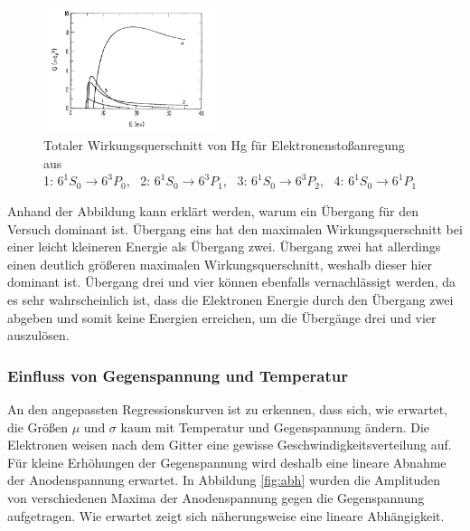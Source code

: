 \begin{figure}[!h]
  \centering
  \includegraphics[width=0.45\textwidth]{data/fh/wirkungsquerschnitt.png}
  \caption{Totaler Wirkungsquerschnitt von Hg für Elektronenstoßanregung aus \cite{wirkungsquerschnitt}\\ 1: $6^1S_0\rightarrow 6^3P_0$, \   2: $6^1S_0\rightarrow 6^3P_1$, \   3: $6^1S_0\rightarrow 6^3P_2$, \   4: $6^1S_0\rightarrow 6^1P_1$}
  \label{fig:wirkungsquerschnitt}
\end{figure}
Anhand der Abbildung kann erklärt werden, warum ein Übergang für den Versuch dominant ist. Übergang eins hat den maximalen Wirkungsquerschnitt bei einer leicht kleineren Energie als Übergang zwei. Übergang zwei hat allerdings einen deutlich größeren maximalen Wirkungsquerschnitt, weshalb dieser hier dominant ist. Übergang drei und vier können ebenfalls vernachlässigt werden, da es sehr wahrscheinlich ist, dass die Elektronen Energie durch den Übergang zwei abgeben und somit keine Energien erreichen, um die Übergänge drei und vier auszulösen.

\subsubsection{Einfluss von Gegenspannung und Temperatur}
An den angepassten Regressionskurven ist zu erkennen, dass sich, wie erwartet, die Größen $\mu$ und $\sigma$ kaum mit Temperatur und Gegenspannung ändern. Die Elektronen weisen nach dem Gitter eine gewisse Geschwindigkeitsverteilung auf. Für kleine Erhöhungen der Gegenspannung wird deshalb eine lineare Abnahme der Anodenspannung erwartet. In Abbildung \ref{fig:abh} wurden die Amplituden von verschiedenen Maxima der Anodenspannung gegen die Gegenspannung aufgetragen. Wie erwartet zeigt sich näherungsweise eine lineare Abhängigkeit.

